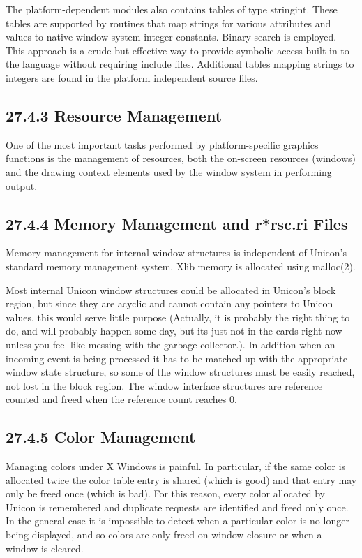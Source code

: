 The platform-dependent modules also contains tables of type
\textsf{stringint}. These tables are supported by routines that map
strings for various attributes and values to native window system
integer constants. Binary search is employed. This approach is a crude
but effective way to provide symbolic access
{\textquotedbl}built-in{\textquotedbl} to the language without
requiring include files. Additional tables mapping strings to
integers are found in the platform independent source files.

\subsection[27.4.3 Resource Management]{27.4.3 Resource Management}

One of the most important tasks performed by platform-specific
graphics functions is the management of resources, both the on-screen
resources (windows) and the drawing context elements used by the
window system in performing output.

\subsection[27.4.4 Memory Management and r*rsc.ri Files]{27.4.4 Memory Management and r*rsc.ri Files}

Memory management for internal window structures is independent of
Unicon's standard memory management system. Xlib memory is allocated
using \textsf{malloc(2)}.

Most internal Unicon window structures could be allocated in Unicon's
block region, but since they are acyclic and cannot contain any
pointers to Unicon values, this would serve little purpose (Actually,
it is probably the right thing to do, and will probably happen some
day, but its just not in the cards right now unless you feel like
messing with the garbage collector.). In addition when an incoming
event is being processed it has to be matched up with the appropriate
window state structure, so some of the window structures must be
easily reached, not lost in the block region. The window interface
structures are reference counted and freed when the reference count
reaches 0.

\subsection[27.4.5 Color Management]{27.4.5 Color Management}

Managing colors under X Windows is painful. In particular, if the same
color is allocated twice the color table entry is shared (which is
good) and that entry may only be freed once (which is bad). For this
reason, every color allocated by Unicon is remembered and duplicate
requests are identified and freed only once. In the general case it is
impossible to detect when a particular color is no longer being
displayed, and so colors are only freed on window closure or when a
window is cleared.

